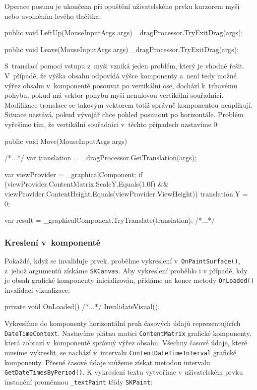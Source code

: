 Operace posunu je ukončena při opuštění uživatelského prvku kurzorem myši nebo uvolněním levého tlačítka:

\begin{csharpcode}
public void LeftUp(MouseInputArgs args) {
	_dragProcessor.TryExitDrag(args);
}
        
public void Leave(MouseInputArgs args) {
	_dragProcessor.TryExitDrag(args);
}
\end{csharpcode}

S~translací pomocí vstupu z~myši vzniká jeden problém, který je vhodné řešit. V~případě, že výška obsahu odpovídá výšce komponenty a~není tedy možné výřez obsahu v~komponentě posouvat po vertikální ose, dochází k~trhavému pohybu, pokud má vektor pohybu myši nenulovou vertikální souřadnici. Modifikace translace se takovým vektorem totiž správně komponentou neaplikují. Situace nastává, pokud vývojář chce pohled posunout po horizontále. Problém vyřešíme tím, že vertikální souřadnici v~těchto případech nastavíme 0:

\begin{csharpcode}
public void Move(MouseInputArgs args) {
	/*...*/
	var translation = _dragProcessor.GetTranslation(args);
	
	var viewProvider = _graphicalComponent;	
	if (viewProvider.ContentMatrix.ScaleY.Equals(1.0f) &&
	    viewProvider.ContentHeight.Equals(viewProvider.ViewHeight)) {
		translation.Y = 0;
	}
	
	var result = _graphicalComponent.TryTranslate(translation);	
	/*...*/
}

\end{csharpcode}

\subsubsection*{Kreslení v~komponentě}
Pokaždé, když se invaliduje prvek, proběhne vykreslení v~\texttt{OnPaintSurface()}, z~jehož argumentů získáme \texttt{SKCanvas}. Aby vykreslení proběhlo i v případě, kdy je obsah grafické komponenty inicializován, přidáme na konec metody \texttt{OnLoaded()} invalidaci vizualizace:

\begin{csharpcode}
private void OnLoaded() {
	/*...*/
	InvalidateVisual();
}
\end{csharpcode}

Vykreslíme do komponenty horizontální pruh časových údajů reprezentujících \texttt{DateTimeContext}. Nastavíme plátnu matici \texttt{ContentMatrix} grafické komponenty, která zobrazí v~komponentě správný výřez obsahu.  Všechny časové údaje, které musíme vykreslit, se nachází v~intervalu \texttt{ContentDateTimeInterval} grafické komponenty. Přesné časové údaje můžeme získat metodou intervalu \linebreak\texttt{GetDateTimesByPeriod()}. K vykreslení textu vytvoříme v uživatelském prvku instanční proměnnou \texttt{\_textPaint} třídy \texttt{SKPaint}:

